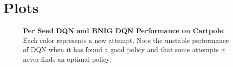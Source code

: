 \chapter{Plots}\label{Appendix}

\begin{figure}[H]
    \centering
    \caption{\textbf{Per Seed DQN and BNIG DQN Performance on Cartpole}: Each color represents a new attempt. Note the unstable performance of DQN when it has found a good policy and that some attempts it never finds an optimal policy.}
    \label{fig:nn_per_cartpole}
\end{figure}
